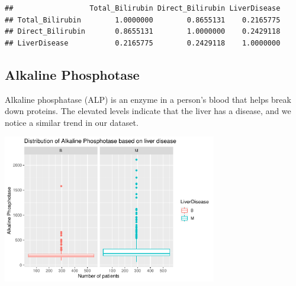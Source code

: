 \documentclass[]{article}
\newenvironment{Shaded}{\begin{snugshade}}{\end{snugshade}}
\newcommand{\CommentTok}[1]{\textcolor[rgb]{0.56,0.35,0.01}{\textit{#1}}}
\newcommand{\DataTypeTok}[1]{\textcolor[rgb]{0.13,0.29,0.53}{#1}}
\newcommand{\KeywordTok}[1]{\textcolor[rgb]{0.13,0.29,0.53}{\textbf{#1}}}
\newcommand{\NormalTok}[1]{#1}
\newcommand{\OperatorTok}[1]{\textcolor[rgb]{0.81,0.36,0.00}{\textbf{#1}}}
\newcommand{\StringTok}[1]{\textcolor[rgb]{0.31,0.60,0.02}{#1}}
\begin{document}
\begin{verbatim}
##                  Total_Bilirubin Direct_Bilirubin LiverDisease
## Total_Bilirubin        1.0000000        0.8655131    0.2165775
## Direct_Bilirubin       0.8655131        1.0000000    0.2429118
## LiverDisease           0.2165775        0.2429118    1.0000000
\end{verbatim}

\subsection{Alkaline Phosphotase}

Alkaline phosphatase (ALP) is an enzyme in a person's blood that helps
break down proteins. The elevated levels indicate that the liver has a
disease, and we notice a similar trend in our dataset.

\begin{Shaded}
\end{Shaded}

\begin{center}
\includegraphics[width=0.7\textwidth]{LiverDisease_files/figure-latex/unnamed-chunk-17-1.pdf}
\end{center}
\end{document}
